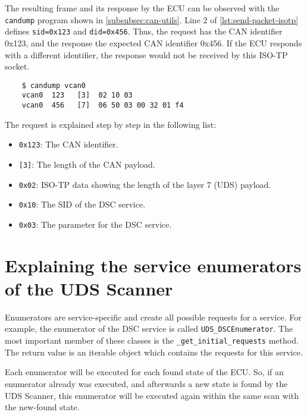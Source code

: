 The resulting frame and its response by the ECU can be observed with the \texttt{candump} program shown in \autoref{subsubsec:can-utils}. 
Line 2 of \autoref{lst:send-packet-isotp} defines \texttt{sid=0x123} and \texttt{did=0x456}. 
Thus, the request has the CAN identifier 0x123, and the response the expected CAN identifier 0x456. If the ECU responds with a different identifier, the response would not be received by this ISO-TP socket.

\begin{samepage}
\begin{verbatim}
    $ candump vcan0
    vcan0  123   [3]  02 10 03
    vcan0  456   [7]  06 50 03 00 32 01 f4
\end{verbatim}
\end{samepage}

The request is explained step by step in the following list:

\begin{itemize}
    \item \texttt{0x123}: The CAN identifier.
    \item \texttt{[3]}: The length of the CAN payload.
    \item \texttt{0x02}: ISO-TP data showing the length of the layer 7 (UDS) payload.
    \item \texttt{0x10}: The SID of the DSC service.
    \item \texttt{0x03}: The parameter for the DSC service.
\end{itemize}

\section{Explaining the service enumerators of the UDS Scanner}


Enumerators are service-specific and create all possible requests for a service.
For example, the enumerator of the DSC service is called \texttt{UDS_DSCEnumerator}. 
The most important member of these classes is the \texttt{_get_initial_requests} method. 
The return value is an iterable object which contains the requests for this service.

Each enumerator will be executed for each found state of the ECU. 
So, if an enumerator already was executed, and afterwards a new state is found by the UDS Scanner, this enumerator will be executed again within the same scan with the new-found state.

